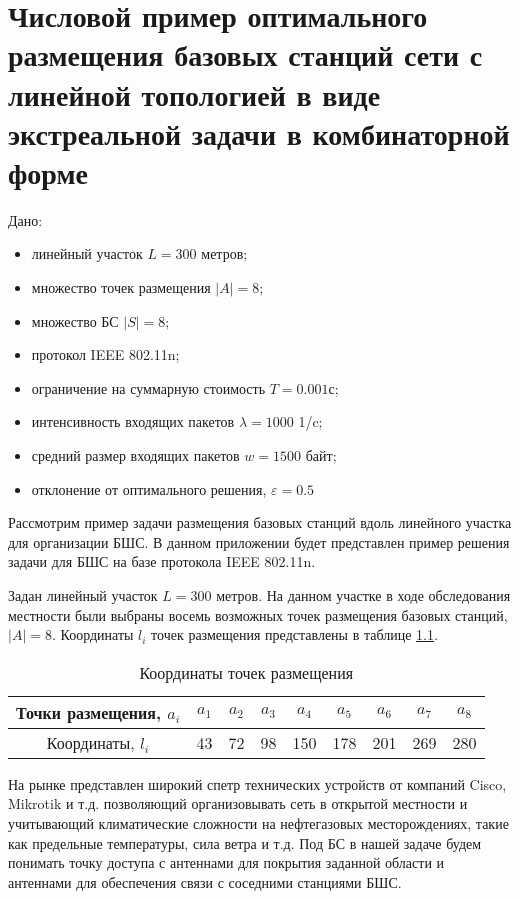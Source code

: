 \chapter{Числовой пример оптимального размещения базовых станций сети с линейной топологией в виде экстреальной задачи в комбинаторной форме}\label{app:bnb_solution}



Дано:
\begin{itemize}
  \item линейный участок $L =300$ метров;
  \item множество точек размещения $|A| =8$;
  \item множество БС $|S| =8$;
  \item протокол IEEE 802.11n;
  \item ограничение на суммарную стоимость $T =0.001$с;
  \item интенсивность входящих пакетов $\lambda = 1000$ 1/c;
  \item средний размер входящих пакетов $w = 1500$ байт;
  \item отклонение от оптимального решения, $\varepsilon=0.5$%
\end{itemize}

Рассмотрим пример задачи размещения базовых станций вдоль линейного участка для организации БШС. В данном приложении будет представлен пример решения задачи для БШС на базе протокола IEEE 802.11n. 





Задан линейный участок $L =300$ метров. На данном участке в ходе обследования местности были выбраны восемь возможных точек размещения базовых станций, $|A| =8$. Координаты $l_i$ точек размещения представлены в таблице \cref{tab:placement_point}.

\begin{table}[h!]\centering
  \begin{tabular}{|c||c|c|c|c|c|c|c|c|}\hline
      
      Точки размещения, $a_i$ &	$a_1$&	$a_2$&	$a_3$&	$a_4$&	$a_5$&	$a_6$&	$a_7$& $a_8$ \\
      \hline
      Координаты, $l_i$ &	43&	72&	98&	150&	178&	201&	269&	280\\
      \hline

\end{tabular}\caption{Координаты точек размещения}\label{tab:placement_point}
\end{table}

На рынке представлен широкий спетр технических устройств от компаний Cisco, Mikrotik и т.д. позволяющий организовывать сеть в открытой местности и учитывающий климатические сложности на нефтегазовых месторождениях, такие как предельные температуры, сила ветра и т.д. Под БС в нашей задаче будем понимать точку доступа с антеннами для покрытия заданной области и антеннами для обеспечения связи с соседними станциями БШС. 

